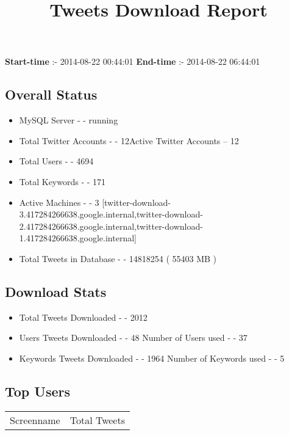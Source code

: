 \documentclass{article}\usepackage[T1]{fontenc}
\begin{document}
\title{\textbf{Tweets Download Report}}
               \date{}
                \maketitle
               \centerline{\textbf{Start-time} :- 2014-08-22 00:44:01 \hspace{40pt} \textbf{End-time} :- 2014-08-22 06:44:01}               \subsection*{Overall Status}                \begin{itemize}                \item MySQL Server - - running               \item Total Twitter Accounts - - 12\newline Active Twitter Accounts -- 12               \item Total Users - - 4694               \item Total Keywords - - 171               \item Active Machines - - 3 [twitter-download-3.417284266638.google.internal,twitter-download-2.417284266638.google.internal,twitter-download-1.417284266638.google.internal]               \item Total Tweets in Database - - 14818254 ( 55403 MB )               \end{itemize}               \subsection*{Download Stats}                \begin{itemize}                \item Total Tweets Downloaded - - 2012               \item Users Tweets Downloaded - - 48 \newline Number of Users used - - 37               \item Keywords Tweets Downloaded - - 1964 \newline Number of Keywords used - - 5              \end{itemize}              \subsection*{Top Users}\begin{tabular}{|c|c|}         \hline         Screenname & Total Tweets \\ 

\end{tabular}
\end{document}
